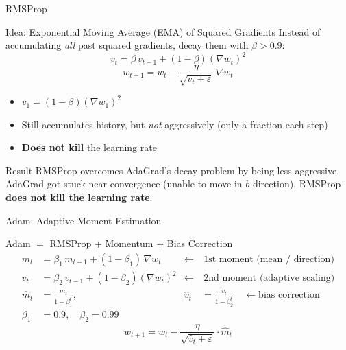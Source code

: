 \documentclass{beamer}
\begin{document}
\begin{frame}[shrink=10]{RMSProp}
  \begin{block}{Idea: Exponential Moving Average (EMA) of Squared Gradients}
    Instead of accumulating \emph{all} past squared gradients, decay
    them with $\beta > 0.9$:
    \[
      v_t = \beta\,v_{t-1} + (1-\beta)(\nabla w_t)^2
    \]
    \[
      \boxed{w_{t+1} = w_t
        - \frac{\eta}{\sqrt{v_t+\varepsilon}}\,\nabla w_t}
    \]
    \begin{itemize}\setlength\itemsep{5pt}
      \item $v_1 = (1-\beta)(\nabla w_1)^2$
      \item Still accumulates history, but \emph{not} aggressively
            (only a fraction each step)
      \item \textbf{Does not kill} the learning rate
    \end{itemize}
  \end{block}

  \medskip

  \begin{exampleblock}{Result}
    RMSProp overcomes AdaGrad's decay problem by being less aggressive.
    AdaGrad got stuck near convergence (unable to move in $b$ direction).
    RMSProp \textbf{does not kill the learning rate}.
  \end{exampleblock}
\end{frame}

\begin{frame}[shrink=10]{Adam: Adaptive Moment Estimation}
  \begin{block}{Adam $=$ RMSProp $+$ Momentum $+$ Bias Correction}
    \begin{align*}
      m_t &= \beta_1\,m_{t-1} + (1-\beta_1)\,\nabla w_t
            &\leftarrow&\ \text{1st moment (mean / direction)}\\
      v_t &= \beta_2\,v_{t-1} + (1-\beta_2)(\nabla w_t)^2
            &\leftarrow&\ \text{2nd moment (adaptive scaling)}\\[6pt]
      \hat{m}_t &= \frac{m_t}{1-\beta_1^t},
      &\hat{v}_t &= \frac{v_t}{1-\beta_2^t}
            \quad\leftarrow\text{bias correction}\\[4pt]
      \beta_1 &= 0.9,\quad \beta_2 = 0.99
    \end{align*}
    \[
      \boxed{w_{t+1} = w_t
        - \frac{\eta}{\sqrt{\hat{v}_t+\varepsilon}}\cdot\hat{m}_t}
    \]
  \end{block}
\end{frame}
\end{document}
